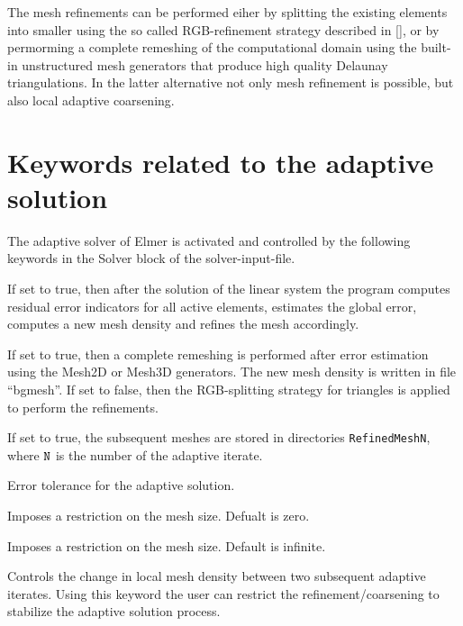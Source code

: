\begin{versiona}
The mesh refinements can be performed eiher by splitting the existing
elements into smaller using the so called RGB-refinement strategy described
in [], or by permorming a complete remeshing of the computational domain using
the built-in unstructured mesh generators that produce high quality Delaunay
triangulations. In the latter alternative not only mesh refinement is
possible, but also local adaptive coarsening.

\section{Keywords related to the adaptive solution}
\end{versiona}

The adaptive solver of Elmer is activated and controlled by the
following keywords in the Solver block of the solver-input-file.

\sifbegin

 If set to true, then after
the solution of the linear system the program computes residual error
indicators for all active elements, estimates the global error, 
computes a new mesh density and refines the mesh accordingly.

 If set to true, then a complete
remeshing is performed after error estimation using the Mesh2D or
Mesh3D generators. The new mesh density is written in file ``bgmesh''. 
If set to false, then the RGB-splitting strategy for triangles is
applied to perform the refinements.

 If set to true, the subsequent
meshes are stored in directories {\tt RefinedMeshN}, where $\tt N$
is the number of the adaptive iterate.

 Error tolerance for the adaptive
solution.

 Imposes a restriction on the mesh size.
Defualt is zero.

 Imposes a restriction on the mesh size.
Default is infinite.

 Controls the change in local
mesh density between two subsequent adaptive iterates. Using this 
keyword the user can restrict the refinement/coarsening to stabilize
the adaptive solution process. 

\sifend

